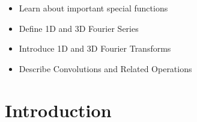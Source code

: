 
\begin{learningobjectives}
{\begin{itemize}
    \item[{\color{OCBurntOrange}\ref{\chabbr:sec:SpecFunc}:}] Learn about important special functions
    \item[{\color{OCBurntOrange}\ref{\chabbr:sec:FourierSeries}:}] Define 1D and 3D Fourier Series\\
    \item[{\color{OCBurntOrange}\ref{\chabbr:sec:FourierTransforms}:}] Introduce 1D and 3D Fourier Transforms       
    \item[{\color{OCBurntOrange}\ref{\chabbr:sec:Convolutions}:}] Describe Convolutions and Related Operations
\end{itemize}}
\end{learningobjectives}


\newcommand{\Sha}{\textls[0]{III}}

\section{Introduction}\label{\chabbr:sec:introduction}

